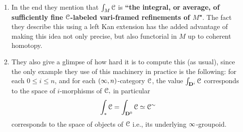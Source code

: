 \begin{enumerate}
    \item In the end they mention that $\int_M \mathcal C$ is \textbf{``the integral, or average, of sufficiently fine $\mathcal C$-labeled vari-framed refinements of $M$"}. The fact they describe this using a left Kan extension has the added advantage of making this idea not only precise, but also functorial in $M$ up to coherent homotopy.
    \item They also give a glimpse of how hard it is to compute this (as usual), since the only example they use of this machinery in practice is the following: for each $0\leq i \leq n$, and for each $(\operatorname{\infty},n)$-category $\mathcal C$, the value $\int_{\mathbf{D}^i}\mathcal C$ corresponds to the space of $i$-morphisms of $\mathcal C,$ in particular \[\int_\ast \mathcal C = \int_{\mathbf{D}^{0}}\mathcal C\simeq \mathcal C^\sim\] corresponds to the space of objects of $\mathcal C$ i.e., its underlying $\operatorname{\infty}$-groupoid.
\end{enumerate}
